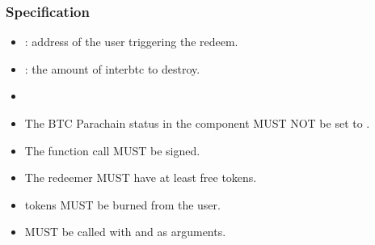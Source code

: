 \documentclass[a4paper,10pt,english]{sphinxmanual}
\begin{document}
\subsubsection{Specification}
\label{\detokenize{spec/redeem:id7}}


\begin{itemize}
\item {} 
: address of the user triggering the redeem.

\item {} 
: the amount of interbtc to destroy.

\end{itemize}

\begin{itemize}
\item {} 

\end{itemize}

\begin{itemize}
\item {} 
The BTC Parachain status in the {\hyperref[\detokenize{spec/security:security}]{}} component MUST NOT be set to .

\item {} 
The function call MUST be signed.

\item {} 
The redeemer MUST have at least  free tokens.

\end{itemize}

\begin{itemize}
\item {} 
 tokens MUST be burned from the user.

\item {} 
{\hyperref[\detokenize{spec/vault-registry:redeemtokensliquidation}]{}} MUST be called with  and  as arguments.

\end{itemize}
\end{document}
